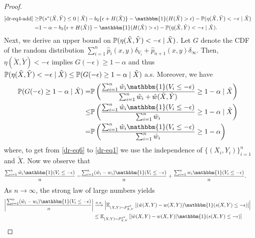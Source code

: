 \begin{proof}
\begin{align}
    \eqref{dr-eq4-add} \geq& \p(s^*(\tilde{X}, \tilde{Y})\leq 0 \mid \tilde{X} ) -  b_2 \{ \epsilon + H(\tilde{X})\} - \mathbbm{1}(H(\tilde{X}) > \epsilon) - \p(\eta(\tilde{X}, \tilde{Y}) < -\epsilon \mid \tilde{X}) \label{dr-eq4} \\
    =& 1 - \alpha -  b_2 \{ \epsilon + H(\tilde{X})\} - \mathbbm{1}(H(\tilde{X}) > \epsilon) - \p(\eta(\tilde{X}, \tilde{Y}) < -\epsilon \mid \tilde{X}). \label{dr-eq5}
\end{align}
Next, we derive an upper bound on $\mathbb{P}(\eta(\tilde{X}, \tilde{Y}) < -\epsilon \mid \tilde{X})$. Let $G$ denote the CDF of the random distribution $\sum_{i=1}^n \hat{p}_i(x, y)\delta_{V_i} + \hat{p}_{n+1}(x, y) \delta_{\infty}$. Then, $\eta(\tilde{X}, \tilde{Y}) < -\epsilon$ implies $G(-\epsilon) \geq 1-\alpha$ and thus $\mathbb{P}(\eta(\tilde{X}, \tilde{Y}) < -\epsilon \mid \tilde{X}) \leq \mathbb{P}(G(-\epsilon) \geq 1-\alpha \mid \tilde{X})$ a.s.
Moreover, we have
\begin{align}
    \p(G(-\epsilon) \geq 1 - \alpha \mid \tilde{X}) =& \p \left( \frac{\sum_{i=1}^n \hat{w}_i \mathbbm{1}(V_i \leq - \epsilon) }{\sum_{i=1}^n \hat{w}_i + \hat{w}(\tilde{X}, \tilde{Y}) } \geq 1 - \alpha \mid \tilde{X} \right) \nonumber \\
    \leq& \p \left( \frac{\sum_{i=1}^n \hat{w}_i \mathbbm{1}(V_i \leq - \epsilon) }{\sum_{i=1}^n \hat{w}_i} \geq 1 - \alpha \mid \tilde{X} \right) \label{dr-eq6} \\ 
    =& \p \left( \frac{\sum_{i=1}^n \hat{w}_i \mathbbm{1}(V_i \leq - \epsilon) }{\sum_{i=1}^n \hat{w}_i} \geq 1 - \alpha \right) \label{dr-eq1}
\end{align}
where, to get from \eqref{dr-eq6} to \eqref{dr-eq1} we use the independence of $\{(X_i, Y_i)\}_{i=1}^n$ and $\tilde{X}$.
Now we observe that
\begin{align}
    \frac{\sum_{i=1}^n \hat{w}_i \mathbbm{1}(V_i \leq - \epsilon) }{n} =& \frac{\sum_{i=1}^n (\hat{w}_i - w_i) \mathbbm{1}(V_i \leq - \epsilon) }{n} + \frac{\sum_{i=1}^n w_i \mathbbm{1}(V_i \leq - \epsilon) }{n}. \nonumber
\end{align}
As $n\rightarrow \infty$, the strong law of large numbers yields
\begin{align}
    \left| \frac{\sum_{i=1}^n (\hat{w}_i - w_i) \mathbbm{1}(V_i \leq - \epsilon) }{n}\right| &\overset{a.s.}{\longrightarrow} \left|\expb\left[ (\hat{w}(X, Y) - w(X,Y))\mathbbm{1}(s(X,Y) \leq -\epsilon)\right]\right| \nonumber \\
    &\leq \expb\left[ |\hat{w}(X, Y) - w(X,Y)|\mathbbm{1}(s(X,Y) \leq -\epsilon)\right] \nonumber \\

\end{align}
\end{proof}
